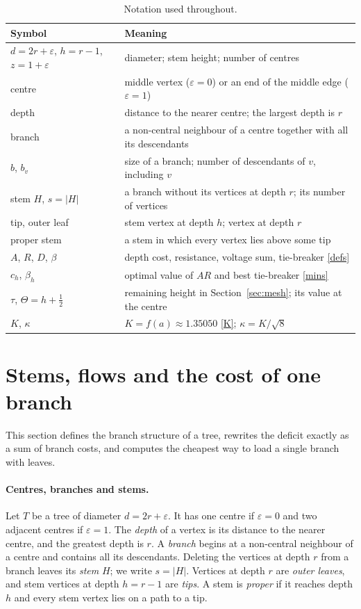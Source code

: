 \documentclass[11pt,a4paper]{article}
\theoremstyle{remark}
\newcommand{\eps}{\varepsilon}
\begin{document}
\begin{table}[tb]
\centering\small\setlength{\tabcolsep}{4pt}
\begin{tabular}{ll}
\toprule
Symbol & Meaning\\
\midrule
$d=2r+\eps$, $h=r-1$, $z=1+\eps$ & diameter; stem height; number of centres\\
centre & middle vertex ($\eps=0$) or an end of the middle edge ($\eps=1$)\\
depth & distance to the nearer centre; the largest depth is $r$\\
branch & a non-central neighbour of a centre together with all its descendants\\
$b$, $b_v$ & size of a branch; number of descendants of $v$, including $v$\\
stem $H$, $s=|H|$ & a branch without its vertices at depth $r$; its number of vertices\\
tip, outer leaf & stem vertex at depth $h$; vertex at depth $r$\\
proper stem & a stem in which every vertex lies above some tip\\
$A$, $R$, $D$, $\beta$ & depth cost, resistance, voltage sum, tie-breaker \eqref{defs}\\
$c_h$, $\beta_h$ & optimal value of $AR$ and best tie-breaker \eqref{mins}\\
$\tau$, $\Theta=h+\frac12$ & remaining height in Section~\ref{sec:mesh}; its value at the centre\\
$K$, $\kappa$ & $K=f(a)\approx1.35050$ \eqref{K}; $\kappa=K/\sqrt8$\\
\bottomrule
\end{tabular}
\caption{Notation used throughout.}\label{tab:notation}
\end{table}

\section{Stems, flows and the cost of one branch}\label{sec:flow}
This section defines the branch structure of a tree, rewrites the deficit exactly as a sum of branch costs, and computes the cheapest way to load a single branch with leaves.

\paragraph{Centres, branches and stems.} Let $T$ be a tree of diameter $d=2r+\eps$. It has one centre if $\eps=0$ and two adjacent centres if $\eps=1$. The \emph{depth} of a vertex is its distance to the nearer centre, and the greatest depth is $r$. A \emph{branch} begins at a non-central neighbour of a centre and contains all its descendants. Deleting the vertices at depth $r$ from a branch leaves its \emph{stem} $H$; we write $s=|H|$. Vertices at depth $r$ are \emph{outer leaves}, and stem vertices at depth $h=r-1$ are \emph{tips}. A stem is \emph{proper} if it reaches depth $h$ and every stem vertex lies on a path to a tip.
\end{document}
